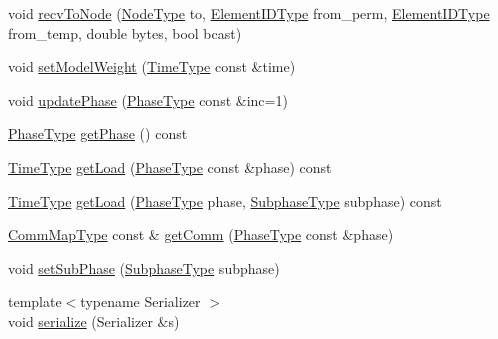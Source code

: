 \begin{DoxyCompactItemize}
\item 
void \hyperlink{structvt_1_1vrt_1_1collection_1_1balance_1_1_element_stats_aa7eb11ba5b2787b129925d9f2cd0ac89}{recv\+To\+Node} (\hyperlink{namespacevt_a866da9d0efc19c0a1ce79e9e492f47e2}{Node\+Type} to, \hyperlink{namespacevt_1_1vrt_1_1collection_1_1balance_a14c8d2c972f2913aa3f1636e5be0a120}{Element\+I\+D\+Type} from\+\_\+perm, \hyperlink{namespacevt_1_1vrt_1_1collection_1_1balance_a14c8d2c972f2913aa3f1636e5be0a120}{Element\+I\+D\+Type} from\+\_\+temp, double bytes, bool bcast)
\item 
void \hyperlink{structvt_1_1vrt_1_1collection_1_1balance_1_1_element_stats_aebacf2dd9e43b4886956741be1647d84}{set\+Model\+Weight} (\hyperlink{namespacevt_a876a9d0cd5a952859c72de8a46881442}{Time\+Type} const \&time)
\item 
void \hyperlink{structvt_1_1vrt_1_1collection_1_1balance_1_1_element_stats_a6ba8726a871702870d76dca6de298d07}{update\+Phase} (\hyperlink{structvt_1_1vrt_1_1collection_1_1balance_1_1_element_stats_a6edee983bb2ae96a341763520af33c66}{Phase\+Type} const \&inc=1)
\item 
\hyperlink{structvt_1_1vrt_1_1collection_1_1balance_1_1_element_stats_a6edee983bb2ae96a341763520af33c66}{Phase\+Type} \hyperlink{structvt_1_1vrt_1_1collection_1_1balance_1_1_element_stats_a24fcc0af9fb6017b556828a52431bc1c}{get\+Phase} () const
\item 
\hyperlink{namespacevt_a876a9d0cd5a952859c72de8a46881442}{Time\+Type} \hyperlink{structvt_1_1vrt_1_1collection_1_1balance_1_1_element_stats_aeb819ff1258eda6a7a1ccbd51b256731}{get\+Load} (\hyperlink{structvt_1_1vrt_1_1collection_1_1balance_1_1_element_stats_a6edee983bb2ae96a341763520af33c66}{Phase\+Type} const \&phase) const
\item 
\hyperlink{namespacevt_a876a9d0cd5a952859c72de8a46881442}{Time\+Type} \hyperlink{structvt_1_1vrt_1_1collection_1_1balance_1_1_element_stats_a04ffe937cfa084fb7bb52820312ec9c2}{get\+Load} (\hyperlink{structvt_1_1vrt_1_1collection_1_1balance_1_1_element_stats_a6edee983bb2ae96a341763520af33c66}{Phase\+Type} phase, \hyperlink{structvt_1_1vrt_1_1collection_1_1balance_1_1_element_stats_af9ec1f2527b6569a003579f7950db71e}{Subphase\+Type} subphase) const
\item 
\hyperlink{namespacevt_1_1vrt_1_1collection_1_1balance_aa50d4cbbfa3c643e7303fc6e08f411fb}{Comm\+Map\+Type} const  \& \hyperlink{structvt_1_1vrt_1_1collection_1_1balance_1_1_element_stats_a917ec0f6f274acc254c24c01fa66afa6}{get\+Comm} (\hyperlink{structvt_1_1vrt_1_1collection_1_1balance_1_1_element_stats_a6edee983bb2ae96a341763520af33c66}{Phase\+Type} const \&phase)
\item 
void \hyperlink{structvt_1_1vrt_1_1collection_1_1balance_1_1_element_stats_a6f24460421195baa579f9a0dc7f6569c}{set\+Sub\+Phase} (\hyperlink{structvt_1_1vrt_1_1collection_1_1balance_1_1_element_stats_af9ec1f2527b6569a003579f7950db71e}{Subphase\+Type} subphase)
\item 
{\footnotesize template$<$typename Serializer $>$ }\\void \hyperlink{structvt_1_1vrt_1_1collection_1_1balance_1_1_element_stats_a2a329a760a794097651a78157cf12452}{serialize} (Serializer \&s)
\end{DoxyCompactItemize}
